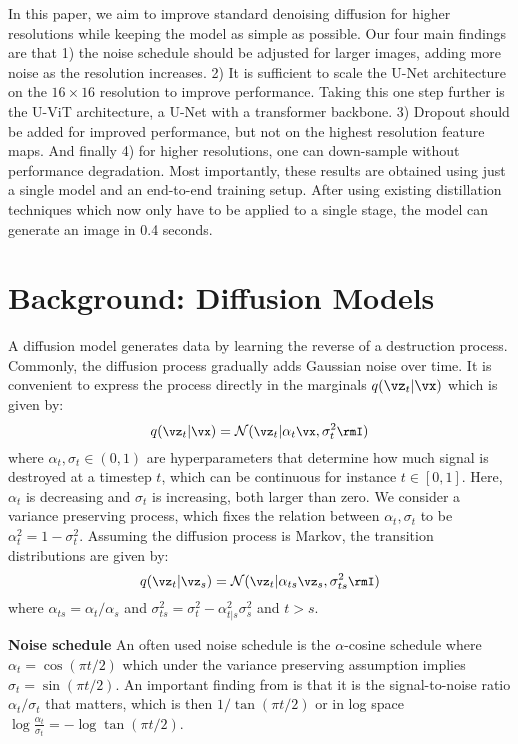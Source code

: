 In this paper, we aim to improve standard denoising diffusion for higher resolutions while keeping the model as simple as possible. Our four main findings are that 1) the noise schedule should be adjusted for larger images,  adding more noise as the resolution increases. 2) It is sufficient to scale the U-Net architecture on the $16 \times 16$ resolution to improve performance. Taking this one step further is the U-ViT architecture, a U-Net with a transformer backbone. 3) Dropout should be added for improved performance, but not on the highest resolution feature maps. And finally 4) for higher resolutions, one can down-sample without performance degradation. 
Most importantly, these results are obtained using just a single model and an end-to-end training setup. After using existing distillation techniques which now only have to be applied to a single stage, the model can generate an image in 0.4 seconds.

\section{Background: Diffusion Models}
\label{sec:background}

A diffusion model generates data by learning the reverse of a destruction process. Commonly, the diffusion process gradually adds Gaussian noise over time. It is convenient to express the process directly in the marginals $q(\vz_t | \vx)$ which is given by:
\begin{equation}\small
    q(\vz_t | \vx) = \mathcal{N}(\vz_t | \alpha_t \vx, \sigma_t^2 \rmI)
\end{equation}
where $\alpha_t, \sigma_t \in (0, 1)$ are hyperparameters that determine how much signal is destroyed at a timestep $t$, which can be continuous for instance $t \in [0, 1]$. Here, $\alpha_t$ is decreasing and $\sigma_t$ is increasing, both larger than zero. We consider a variance preserving process, which fixes the relation between $\alpha_t, \sigma_t$ to be $\alpha_t^2 = 1 - \sigma_t^2$. Assuming the diffusion process is Markov, the transition distributions are given by:
\begin{equation}\small
    q(\vz_t | \vz_s) = \mathcal{N}(\vz_t | \alpha_{ts} \vz_s, \sigma_{ts}^2 \rmI)
\end{equation}
where $\alpha_{ts} = \alpha_t / \alpha_s$ and $\sigma_{ts}^2 = \sigma_t^2 - \alpha_{t|s}^2 \sigma_s^2$ and $t > s$.

\textbf{Noise schedule}
An often used noise schedule is the $\alpha$-cosine schedule where $\alpha_t = \cos(\pi t / 2)$ which under the variance preserving assumption implies $\sigma_t = \sin(\pi t / 2)$. An important finding from \citep{kingma2021vdm} is that it is the signal-to-noise ratio $\alpha_t / \sigma_t$ that matters, which is then $1 / \tan(\pi t / 2)$ or in log space $\log \frac{\alpha_t}{\sigma_t} = -\log \tan(\pi t / 2)$. 

